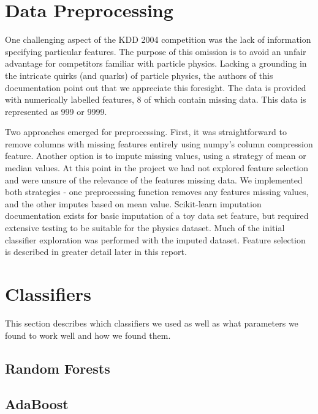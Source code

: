 \documentclass{article}
\begin{document}


\section{Data Preprocessing}

One challenging aspect of the KDD 2004 competition was the lack of information specifying particular features.
The purpose of this omission is to avoid an unfair advantage for competitors familiar with particle physics.
Lacking a grounding in the intricate quirks (and quarks) of particle physics, the authors of this documentation point out that we appreciate this foresight.
The data is provided with numerically labelled features, 8 of which contain missing data.
This data is represented as 999 or 9999.

Two approaches emerged for preprocessing.
First, it was straightforward to remove columns with missing features entirely using numpy's column compression feature.
Another option is to impute missing values, using a strategy of mean or median values.
At this point in the project we had not explored feature selection and were unsure of the relevance of the features missing data.
We implemented both strategies - one preprocessing function removes any features missing values, and the other imputes based on mean value.
Scikit-learn imputation documentation exists for basic imputation of a toy data set feature, but required extensive testing to be suitable for the physics dataset.
Much of the initial classifier exploration was performed with the imputed dataset.
Feature selection is described in greater detail later in this report.


\section{Classifiers}

This section describes which classifiers we used as well as what parameters we found to work well and how we found them.
 
\subsection{Random Forests}

\subsection{AdaBoost}
\end{document}
